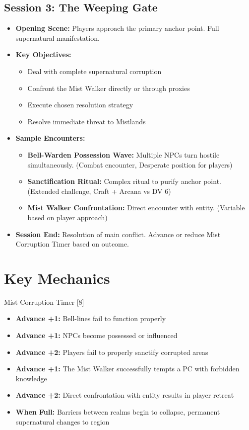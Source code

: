 \documentclass[11pt]{article}
\begin{document}
\subsection*{Session 3: The Weeping Gate}
\begin{itemize}
    \item \textbf{Opening Scene:} Players approach the primary anchor point. Full supernatural manifestation.
    \item \textbf{Key Objectives:}
    \begin{itemize}
        \item Deal with complete supernatural corruption
        \item Confront the Mist Walker directly or through proxies
        \item Execute chosen resolution strategy
        \item Resolve immediate threat to Mistlands
    \end{itemize}
    \item \textbf{Sample Encounters:}
    \begin{itemize}
        \item \textbf{Bell-Warden Possession Wave:} Multiple NPCs turn hostile simultaneously. (Combat encounter, Desperate position for players)
        \item \textbf{Sanctification Ritual:} Complex ritual to purify anchor point. (Extended challenge, Craft + Arcana vs DV 6)
        \item \textbf{Mist Walker Confrontation:} Direct encounter with entity. (Variable based on player approach)
    \end{itemize}
    \item \textbf{Session End:} Resolution of main conflict. Advance or reduce Mist Corruption Timer based on outcome.
\end{itemize}

\section*{Key Mechanics}

\begin{mechanicsbox}{Mist Corruption Timer [8]}
\begin{itemize}
    \item \textbf{Advance +1:} Bell-lines fail to function properly
    \item \textbf{Advance +1:} NPCs become possessed or influenced
    \item \textbf{Advance +2:} Players fail to properly sanctify corrupted areas
    \item \textbf{Advance +1:} The Mist Walker successfully tempts a PC with forbidden knowledge
    \item \textbf{Advance +2:} Direct confrontation with entity results in player retreat
    \item \textbf{When Full:} Barriers between realms begin to collapse, permanent supernatural changes to region
\end{itemize}
\end{mechanicsbox}
\end{document}
